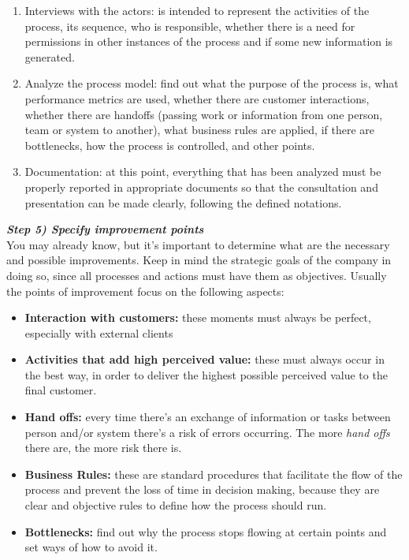 \documentclass{article}
\begin{document}
{\begin{enumerate}
    \item Interviews with the actors: is intended to represent the activities of the process, its sequence, who is responsible, whether there is a need for permissions in other instances of the process and if some new information is generated. 
    \item Analyze the process model: find out what the purpose of the process is, what performance metrics are used, whether there are customer interactions, whether there are handoffs (passing work or information from one person, team or system to another), what business rules are applied, if there are bottlenecks, how the process is controlled, and other points.
    \item Documentation: at this point, everything that has been analyzed must be properly reported in appropriate documents so that the consultation and presentation can be made clearly, following the defined notations. 
\end{enumerate}

\vspace{0.3cm} 

\textbf{\textit{Step 5) Specify improvement points}} \\

You may already know, but it’s important to determine what are the necessary and possible improvements. Keep in mind the strategic goals of the company in doing so, since all processes and actions must have them as objectives. Usually the points of improvement focus on the following aspects: \\

\begin{itemize}
    \item \textbf{Interaction with customers:} these moments must always be perfect, especially with external clients
    \item \textbf{Activities that add high perceived value:} these must always occur in the best way, in order to deliver the highest possible perceived value to the final customer.
    \item \textbf{Hand offs:} every time there’s an exchange of information or tasks between person and/or system there’s a risk of errors occurring. The more \textit{hand offs} there are, the more risk there is.
    \item \textbf{Business Rules:} these are standard procedures that facilitate the flow of the process and prevent the loss of time in decision making, because they are clear and objective rules to define how the process should run.
    \item \textbf{Bottlenecks:} find out why the process stops flowing at certain points and set ways of how to avoid it.
\end{itemize}

}
\end{document}
